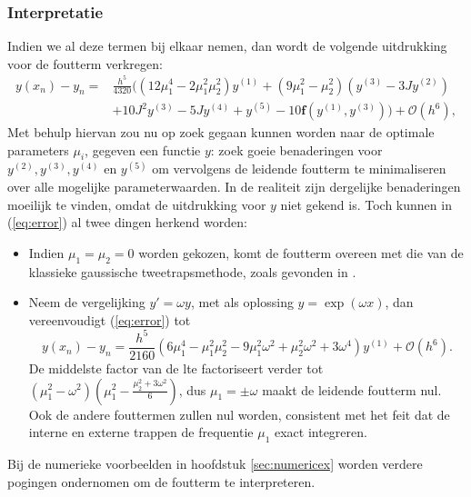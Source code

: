 \documentclass[12pt]{article}
\begin{document}
\subsubsection{Interpretatie}
Indien we al deze termen bij elkaar nemen, dan wordt de volgende uitdrukking voor de foutterm verkregen:
\begin{equation}\label{eq:error}
\begin{split}
    y(x_n)-y_n=&\frac{h^5}{4320}\Big((12\mu_1^4-2\mu_1^2\mu_2^2)y^{(1)}+(9\mu_1^2-\mu_2^2)(y^{(3)}-3Jy^{(2)}) \\
    & +10J^2y^{(3)}-5Jy^{(4)}+y^{(5)}-10\mathbf{f}(y^{(1)},y^{(3)})\Big)+\mathcal{O}(h^6),
\end{split}
\end{equation}
Met behulp hiervan zou nu op zoek gegaan kunnen worden naar de optimale parameters \(\mu_i\), gegeven een functie \(y\): zoek goeie benaderingen voor \(y^{(2)},y^{(3)},y^{(4)}\) en \(y^{(5)}\) om vervolgens de leidende foutterm te minimaliseren over alle mogelijke parameterwaarden. In de realiteit zijn dergelijke benaderingen moeilijk te vinden, omdat de uitdrukking voor \(y\) niet gekend is. Toch kunnen in (\ref{eq:error}) al twee dingen herkend worden:
\begin{itemize}
    \item Indien \(\mu_1=\mu_2=0\) worden gekozen, komt de foutterm overeen met die van de klassieke gaussische tweetrapsmethode, zoals gevonden in \cite{EFRKfixedvar}.
    \item Neem de vergelijking \(y'=\omega y\), met als oplossing \(y=\exp(\omega x)\), dan vereenvoudigt (\ref{eq:error}) tot
    \[y(x_n)-y_n=\frac{h^5}{2160}(6\mu^4_1-\mu_1^2\mu_2^2-9\mu_1^2\omega^2+\mu_2^2\omega^2+3\omega^4)y^{(1)}+\mathcal{O}(h^6).\]
    De middelste factor van de lte factoriseert verder tot \((\mu_1^2-\omega^2)(\mu_1^2-\frac{\mu_2^2+3\omega^2}{6})\), dus \(\mu_1=\pm\omega\) maakt de leidende foutterm nul. Ook de andere fouttermen zullen nul worden, consistent met het feit dat de interne en externe trappen de frequentie \(\mu_1\) exact integreren.
\end{itemize}
Bij de numerieke voorbeelden in hoofdstuk \ref{sec:numericex} worden verdere pogingen ondernomen om de foutterm te interpreteren.
\end{document}
